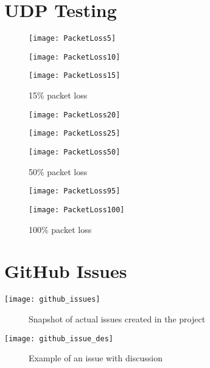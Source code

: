 \begin{appendices}
%
\chapter{UDP Testing}
\label{ref:udpTesting}
\newcommand{\udpScale}{0.5}
\newcommand{\figureText}[1]{#1\% packet loss}

\begin{figure}[!htb]
  \texttt{[image: PacketLoss5]}
  \caption{\figureText{5}}
\endminipage\hfill
{}
  \texttt{[image: PacketLoss10]}
  \caption{\figureText{10}}
\endminipage\hfill
{}
  \texttt{[image: PacketLoss15]}
  \caption{\figureText{15}}
\endminipage
\end{figure}

\begin{figure}[!htb]
  \texttt{[image: PacketLoss20]}
  \caption{\figureText{20}}
\endminipage\hfill
{}
  \texttt{[image: PacketLoss25]}
 \caption{\figureText{25}}
\endminipage\hfill
{}
  \texttt{[image: PacketLoss50]}
  \caption{\figureText{50}}
\endminipage
\end{figure}

\begin{figure}[!htb]
  	\texttt{[image: PacketLoss95]}
  	\caption{\figureText{95}}
\endminipage\hfill
{}
  	\texttt{[image: PacketLoss100]}
  	\caption{\figureText{100}}
\endminipage\hfill
{}
  	\hfill
\endminipage
\end{figure}

%
\chapter{GitHub Issues}
\begin{center}
	\label{ref:GitHubAppendix}
	\texttt{[image: github\_issues]}
	\begin{figure}[h]
		\caption{Snapshot of actual issues created in the project}
		\label{ref:GitHubIssues}
	\end{figure}			
\end{center}

\begin{center}
	\texttt{[image: github\_issue\_des]}
	\begin{figure}[h]
		\caption{Example of an issue with discussion}
		\label{ref:GitHubIssueExample}
	\end{figure}	
\end{center}


\end{appendices}
